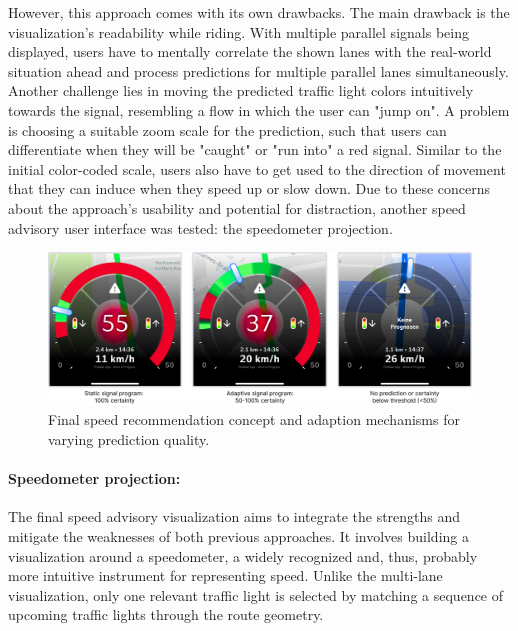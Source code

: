 However, this approach comes with its own drawbacks. The main drawback is the visualization's readability while riding. With multiple parallel signals being displayed, users have to mentally correlate the shown lanes with the real-world situation ahead and process predictions for multiple parallel lanes simultaneously. Another challenge lies in moving the predicted traffic light colors intuitively towards the signal, resembling a flow in which the user can "jump on". A problem is choosing a suitable zoom scale for the prediction, such that users can differentiate when they will be "caught" or "run into" a red signal. Similar to the initial color-coded scale, users also have to get used to the direction of movement that they can induce when they speed up or slow down. Due to these concerns about the approach's usability and potential for distraction, another speed advisory user interface was tested: the speedometer projection.

\begin{figure}[htbp]
\centering
\includegraphics[width=\linewidth]{images/speedometer-adaptions.png}
\caption{Final speed recommendation concept and adaption mechanisms for varying prediction quality.}
\label{fig:speedometer-adaptions}
\end{figure}

\paragraph{Speedometer projection:} The final speed advisory visualization aims to integrate the strengths and mitigate the weaknesses of both previous approaches. It involves building a visualization around a speedometer, a widely recognized and, thus, probably more intuitive instrument for representing speed. Unlike the multi-lane visualization, only one relevant traffic light is selected by matching a sequence of upcoming traffic lights through the route geometry.

